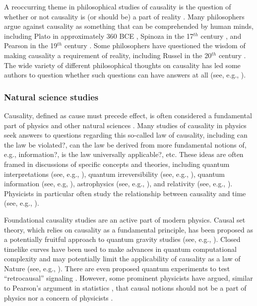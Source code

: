 \documentclass{article}[10pt]
\begin{document}
A reoccurring theme in philosophical studies of causality is the question of whether or not causality is (or should be) a part of reality \cite{Zheng2010,Illari2014}.  Many philosophers argue against causality as something that can be comprehended by human minds, including Plato in approximately 360 BCE \cite{Plato2010}, Spinoza in the 17$^{th}$ century \cite{Spinoza1955}, and Pearson in the 19$^{th}$ century \cite{Pearson1903}.  Some philosophers have questioned the wisdom of making causality a requirement of reality, including Russel in the 20$^{th}$ century \cite{Russell1912,Russell1948}.  The wide variety of different philosophical thoughts on causality has led some authors to question whether such questions can have answers at all (see, e.g., \cite{Shugan2007,Illari2011b,Salmon1998}).

\subsubsection{Natural science studies} 
Causality, defined as cause must precede effect, is often considered a fundamental part of physics and other natural sciences \cite{Bohm1971,Bunge1979}.  Many studies of causality in physics seek answers to questions regarding this so-called law of causality, including can the law be violated?, can the law be derived from more fundamental notions of, e.g., information?, is the law universally applicable?, etc.  These ideas are often framed in discussions of specific concepts and theories, including quantum interpretations (see, e.g., \cite{Bohr1963,Bohr1937,Riggs2009}), quantum irreversibility (see, e.g., \cite{Bohm2013}), quantum information (see, e.g, \cite{Pawlowski2009,Kuzmich2001}), astrophysics (see, e.g., \cite{Smolin2006,Gibbons1999}), and relativity (see, e.g., \cite{Zeeman1964,Tipler1977,Liberati2002}).  Physicists in particular often study the relationship between causality and time (see, e.g., \cite{Ellis2005,Barbour1999,Schulman1997,Penrose1999}).

Foundational causality studies are an active part of modern physics.  Causal set theory, which relies on causality as a fundamental principle, has been proposed as a potentially fruitful approach to quantum gravity studies (see, e.g., \cite{Dowker2006,Bombelli1987}).  Closed timelike curves \cite{Thorne1993} have been used to make advances in quantum computational complexity \cite{Aaronson2009} and may potentially limit the applicability of causality as a law of Nature (see, e.g., \cite{Lobo2003,Korotaev2015}).  There are even proposed quantum experiments to test ``retrocausal'' signaling \cite{Cramer2014}.  However, some prominent physicists have argued, similar to Pearson's argument in statistics \cite{Pearson1903}, that causal notions should not be a part of physics nor a concern of physicists \cite{Mach1986}.
\end{document}
